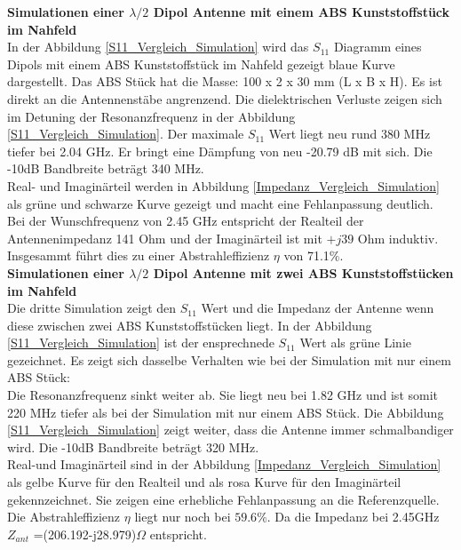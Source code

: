 \textbf{Simulationen einer $\lambda/2$ Dipol Antenne mit einem ABS Kunststoffstück im Nahfeld}\\
In der Abbildung \ref{S11_Vergleich_Simulation} wird das $S_{11}$ Diagramm eines Dipols mit einem ABS Kunststoffstück im Nahfeld gezeigt  blaue Kurve dargestellt. Das ABS Stück hat die Masse: 100 x 2 x 30 mm (L x B x H). Es ist direkt an die Antennenstäbe angrenzend. Die dielektrischen Verluste zeigen sich im Detuning der Resonanzfrequenz in der Abbildung \ref{S11_Vergleich_Simulation}. Der maximale $S_{11}$ Wert liegt neu rund 380 MHz tiefer bei 2.04 GHz. Er bringt eine Dämpfung von neu -20.79 dB mit sich. Die -10dB Bandbreite beträgt 340 MHz.\\

Real- und Imaginärteil werden in Abbildung \ref{Impedanz_Vergleich_Simulation} als grüne und schwarze Kurve gezeigt und macht eine Fehlanpassung deutlich. Bei der Wunschfrequenz von 2.45 GHz entspricht der Realteil der Antennenimpedanz 141 Ohm und der Imaginärteil ist mit $+j39$ Ohm induktiv. Insgesammt führt dies zu einer Abstrahleffizienz $\eta$ von 71.1$\%$.\\

\textbf{Simulationen einer $\lambda/2$ Dipol Antenne mit zwei ABS Kunststoffstücken im Nahfeld}\\
Die dritte Simulation zeigt den $S_{11}$ Wert und die Impedanz der Antenne wenn diese zwischen zwei ABS Kunststoffstücken liegt. In der Abbildung \ref{S11_Vergleich_Simulation} ist der ensprechnede $S_{11}$ Wert als grüne Linie gezeichnet. Es zeigt sich dasselbe Verhalten wie bei der Simulation mit nur einem ABS Stück: \\
Die Resonanzfrequenz sinkt weiter ab. Sie liegt neu bei 1.82 GHz und ist somit 220 MHz tiefer als bei der Simulation mit nur einem ABS Stück. Die Abbildung \ref{S11_Vergleich_Simulation} zeigt weiter, dass die Antenne immer schmalbandiger wird. Die -10dB Bandbreite beträgt 320 MHz.\\
Real-und Imaginärteil sind in der Abbildung \ref{Impedanz_Vergleich_Simulation} als gelbe Kurve für den Realteil und als rosa Kurve für den Imaginärteil gekennzeichnet. Sie zeigen eine erhebliche Fehlanpassung an die Referenzquelle. Die Abstrahleffizienz $\eta$ liegt nur noch bei $59.6 \%$. Da die Impedanz bei 2.45GHz $Z_{ant}$ =(206.192-j28.979)$\Omega$  entspricht.\\





